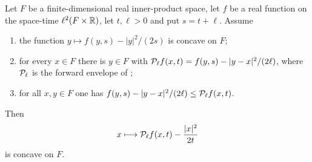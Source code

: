 \begin{lemma}
Let $F$ be a finite-dimensional real inner-product space, let $f$ be a real function on
the space-time $\ell^2(F\times\mathbb{R})$, let $t,\ell>0$ and put $s=t+\ell$. Assume
\begin{enumerate}
\item the function $y\mapsto f(y,s)-|y|^2/(2s)$ is concave on $F$;
\item for every $x\in F$ there is $y\in F$ with
  $\mathcal{P}_\ell f(x,t)=f(y,s)-|y-x|^2/(2\ell)$, where $\mathcal{P}_\ell$ is the forward envelope
  of ;
\item for all $x,y\in F$ one has $f(y,s)-|y-x|^2/(2\ell)\le\mathcal{P}_\ell f(x,t)$.
\end{enumerate}
Then
\[
  x\longmapsto\mathcal{P}_\ell f(x,t)-\frac{|x|^2}{2t}
\]
is concave on $F$.
\end{lemma}
